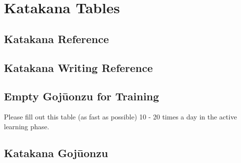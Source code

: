 \chapter{Katakana Tables} \label{chap:KatakanaTables}

\section{Katakana Reference}


\section{Katakana Writing Reference}


%

\newpage

\section{Empty Gojūonzu for Training}
\label{app:Leere50LauteTafel} Please fill out this table (as fast as possible)
10 - 20 times a day in the active learning phase.


\newpage\section{Katakana Gojūonzu}


%

